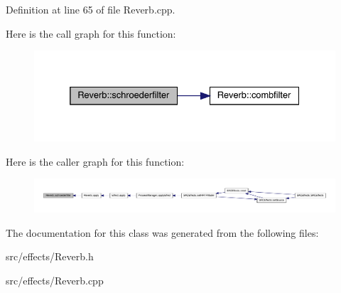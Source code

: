 Definition at line 65 of file Reverb.\+cpp.

Here is the call graph for this function\+:
\nopagebreak
\begin{figure}[H]
\begin{center}
\leavevmode
\includegraphics[width=332pt]{class_reverb_acbac17709b0977fc0fabdb7bc2aa2f50_cgraph}
\end{center}
\end{figure}
Here is the caller graph for this function\+:
\nopagebreak
\begin{figure}[H]
\begin{center}
\leavevmode
\includegraphics[width=350pt]{class_reverb_acbac17709b0977fc0fabdb7bc2aa2f50_icgraph}
\end{center}
\end{figure}


The documentation for this class was generated from the following files\+:\begin{DoxyCompactItemize}
\item 
src/effects/Reverb.\+h\item 
src/effects/Reverb.\+cpp\end{DoxyCompactItemize}
